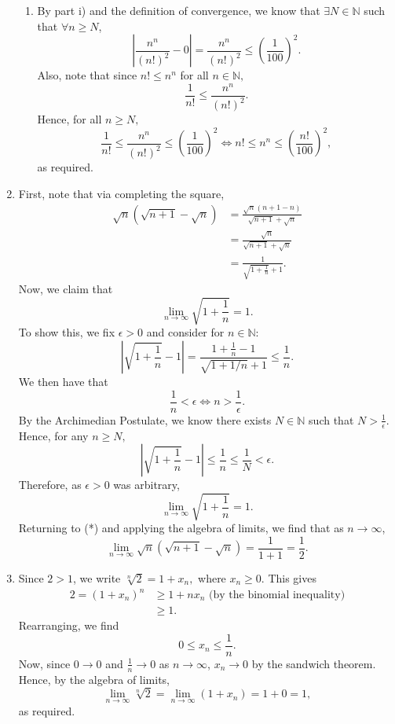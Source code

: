 \documentclass[
  12pt,
  a4paper]{extarticle}
\theoremstyle{plain}
\theoremstyle{definition}
\theoremstyle{plain}
\theoremstyle{plain}
\theoremstyle{plain}
\theoremstyle{plain}
\theoremstyle{definition}
\theoremstyle{definition}
\theoremstyle{remark}
\theoremstyle{remark}
\renewcommand{\;}{\,}
\begin{document}
\begin{enumerate}
\begin{enumerate}
  \item
    By part i) and the definition of convergence, we know that \(\exists N \in \mathbb{N}\) such that \(\forall n \geq N\), \[\left\lvert\frac{n^n}{(n!)^2} - 0 \right\rvert =  \frac{n^n}{(n!)^2} \leq \left(\frac{1}{100}\right)^2.\] Also, note that since \(n! \leq n^n\) for all \(n \in \mathbb{N},\) \[\frac{1}{n!} \leq \frac{n^n}{(n!)^2}.\] Hence, for all \(n \geq N,\) \[\frac{1}{n!} \leq \frac{n^n}{(n!)^2} \leq \left(\frac{1}{100}\right)^2 \Longleftrightarrow n! \leq n^n \leq \left(\frac{n!}{100}\right)^2,\] as required.
  \end{enumerate}
\item
  First, note that via completing the square, \begin{align}\sqrt{n}(\sqrt{n+1} - \sqrt{n}) &= \frac{\sqrt{n}(n+1 - n)}{\sqrt{n+1} + \sqrt{n}}\nonumber\\ &= \frac{\sqrt{n}}{\sqrt{n+1} + \sqrt{n}}\nonumber\\ &= \frac{1}{\sqrt{1 + \frac{1}{n}} + 1}.\tag{*}\end{align} Now, we claim that \[\lim_{n \to \infty} \sqrt{1 + \frac{1}{n}} = 1.\] To show this, we fix \(\epsilon > 0\) and consider for \(n \in \mathbb{N}:\) \[\left\lvert \sqrt{1 + \frac{1}{n}} - 1\right\rvert = \frac{1 + \frac{1}{n}-1}{\sqrt{1 + 1/n}+1} \leq \frac{1}{n}.\] We then have that \[\frac{1}{n} < \epsilon \Longleftrightarrow n > \frac{1}{\epsilon}.\] By the Archimedian Postulate, we know there exists \(N \in \mathbb{N}\) such that \(N > \frac{1}{\epsilon}.\) Hence, for any \(n \geq N,\) \[\left\lvert \sqrt{1 + \frac{1}{n}} - 1\right\rvert \leq \frac{1}{n} \leq \frac{1}{N} < \epsilon.\] Therefore, as \(\epsilon > 0\) was arbitrary, \[\lim_{n \to \infty} \sqrt{1 + \frac{1}{n}} = 1.\] Returning to (*) and applying the algebra of limits, we find that as \(n \to \infty\), \[\lim_{n \to \infty}\sqrt{n}(\sqrt{n+1} - \sqrt{n}) = \frac{1}{1+1} = \frac{1}{2}.\]
\item
  Since \(2 > 1\), we write \(\sqrt[n]{2} = 1 + x_n,\) where \(x_n \geq 0\). This gives \begin{align*}
  2 = (1 + x_n)^n &\geq 1 + nx_n \;\; \text{(by the binomial inequality)}\\ &\geq 1. \end{align*} Rearranging, we find \[0 \leq x_n \leq \frac{1}{n}.\] Now, since \(0 \to 0\) and \(\frac{1}{n} \to 0\) as \(n \to \infty\), \(x_n \to 0\) by the sandwich theorem. Hence, by the algebra of limits, \[\lim_{n \to \infty} \sqrt[n]{2} = \lim_{n\to\infty}(1 + x_n) = 1 + 0 = 1,\] as required.
\end{enumerate}
\end{document}
